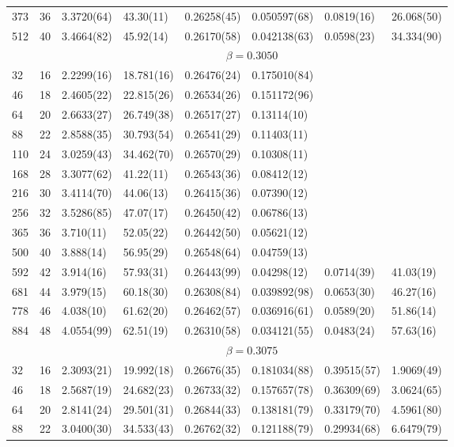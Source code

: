 \documentclass[12pt]{article}
\begin{document}
\begin{table}
\begin{tabular}{llllllll}
373 & 36 & 3.3720(64) & 43.30(11) & 0.26258(45) & 0.050597(68) & 0.0819(16) & 26.068(50)\\ 
512 & 40 & 3.4664(82) & 45.92(14) & 0.26170(58) & 0.042138(63) & 0.0598(23) & 34.334(90)\\ 
\hline 
  & & \multicolumn{6}{c}{$ \beta = 0.3050 $} \\ 
 \hline 
32 & 16 & 2.2299(16) & 18.781(16) & 0.26476(24) & 0.175010(84) &  &   \\ 
46 & 18 & 2.4605(22) & 22.815(26) & 0.26534(26) & 0.151172(96) &   &   \\ 
64 & 20 & 2.6633(27) & 26.749(38) & 0.26517(27) & 0.13114(10) &    &   \\ 
88 & 22 & 2.8588(35) & 30.793(54) & 0.26541(29) & 0.11403(11) &    &   \\ 
110 & 24 & 3.0259(43) & 34.462(70) & 0.26570(29) & 0.10308(11) &    &   \\ 
168 & 28 & 3.3077(62) & 41.22(11) & 0.26543(36) & 0.08412(12) &    &   \\ 
216 & 30 & 3.4114(70) & 44.06(13) & 0.26415(36) & 0.07390(12) &    &   \\ 
256 & 32 & 3.5286(85) & 47.07(17) & 0.26450(42) & 0.06786(13) &    &   \\ 
365 & 36 & 3.710(11) & 52.05(22) & 0.26442(50) & 0.05621(12) &    &   \\ 
500 & 40 & 3.888(14) & 56.95(29) & 0.26548(64) & 0.04759(13) &    &   \\ 
592 & 42 & 3.914(16) & 57.93(31) & 0.26443(99) & 0.04298(12) & 0.0714(39) & 41.03(19)\\ 
681 & 44 & 3.979(15) & 60.18(30) & 0.26308(84) & 0.039892(98) & 0.0653(30) & 46.27(16)\\ 
778 & 46 & 4.038(10) & 61.62(20) & 0.26462(57) & 0.036916(61) & 0.0589(20) & 51.86(14)\\ 
884 & 48 & 4.0554(99) & 62.51(19) & 0.26310(58) & 0.034121(55) & 0.0483(24) & 57.63(16)\\ 
\hline 
  & & \multicolumn{6}{c}{$ \beta = 0.3075 $} \\ 
 \hline 
32 & 16 & 2.3093(21) & 19.992(18) & 0.26676(35) & 0.181034(88) & 0.39515(57) & 1.9069(49)\\ 
46 & 18 & 2.5687(19) & 24.682(23) & 0.26733(32) & 0.157657(78) & 0.36309(69) & 3.0624(65)\\ 
64 & 20 & 2.8141(24) & 29.501(31) & 0.26844(33) & 0.138181(79) & 0.33179(70) & 4.5961(80)\\ 
88 & 22 & 3.0400(30) & 34.533(43) & 0.26762(32) & 0.121188(79) & 0.29934(68) & 6.6479(79)\\ 

\end{tabular}
\end{table}
\end{document}
